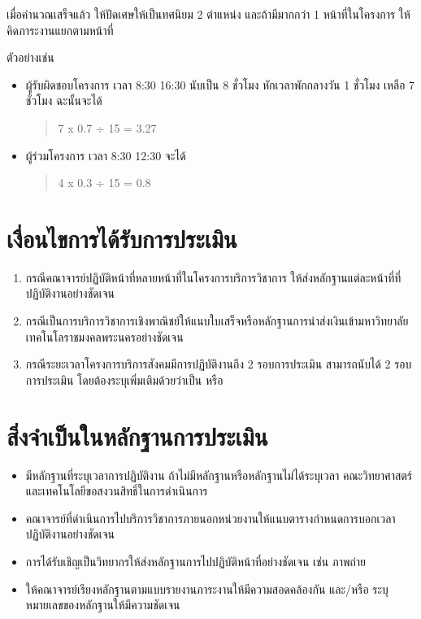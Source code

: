 \documentclass[a4paper,12pt,english]{sphinxmanual}
\begin{document}
เมื่อคำนวณเสร็จแล้ว ให้ปัดเศษให้เป็นทศนิยม 2 ตำแหน่ง และถ้ามีมากกว่า 1 หน้าที่ในโครงการ ให้คิดภาระงานแยกตามหน้าที่

ตัวอย่างเช่น
\begin{itemize}
\item {} 
ผู้รับผิดชอบโครงการ เวลา 8:30 \sphinxhyphen{} 16:30 นับเป็น 8 ชั่วโมง หักเวลาพักกลางวัน 1 ชั่วโมง เหลือ 7 ชั่วโมง ฉะนั้นจะได้
\begin{quote}

7 x 0.7 ÷ 15 = 3.27
\end{quote}

\item {} 
ผู้ร่วมโครงการ เวลา 8:30 \sphinxhyphen{} 12:30 จะได้
\begin{quote}

4 x 0.3 ÷ 15 = 0.8
\end{quote}

\end{itemize}


\section{เงื่อนไขการได้รับการประเมิน}
\label{\detokenize{3service:id3}}\begin{enumerate}
%
\item {} 
กรณีคณาจารย์ปฏิบัติหน้าที่หลายหน้าที่ในโครงการบริการวิชาการ ให้ส่งหลักฐานแต่ละหน้าที่ที่ปฏิบัติงานอย่างชัดเจน

\item {} 
กรณีเป็นการบริการวิชาการเชิงพาณิชย์ให้แนบใบเสร็จหรือหลักฐานการนำส่งเงินเข้ามหาวิทยาลัยเทคโนโลราชมงคลพระนครอย่างชัดเจน

\item {} 
กรณีระยะเวลาโครงการบริการสังคมมีการปฏิบัติงานถึง 2 รอบการประเมิน สามารถนับได้ 2 รอบการประเมิน โดยต้องระบุเพิ่มเติมด้วยว่าเป็น  หรือ 

\end{enumerate}


\section{สิ่งจำเป็นในหลักฐานการประเมิน}
\label{\detokenize{3service:id4}}\begin{itemize}
\item {} 
 มีหลักฐานที่ระบุเวลาการปฏิบัติงาน ถ้าไม่มีหลักฐานหรือหลักฐานไม่ได้ระบุเวลา คณะวิทยาศาสตร์และเทคโนโลยีขอสงวนสิทธิ์ในการดำเนินการ

\item {} 
คณาจารย์ที่ดำเนินการไปบริการวิชาการภายนอกหน่วยงานให้แนบตารางกำหนดการบอกเวลาปฏิบัติงานอย่างชัดเจน

\item {} 
การได้รับเชิญเป็นวิทยากรให้ส่งหลักฐานการไปปฏิบัติหน้าที่อย่างชัดเจน เช่น ภาพถ่าย

\item {} 
ให้คณาจารย์เรียงหลักฐานตามแบบรายงานภาระงานให้มีความสอดคล้องกัน และ/หรือ ระบุหมายเลขของหลักฐานให้มีความชัดเจน

\end{itemize}
\end{document}
